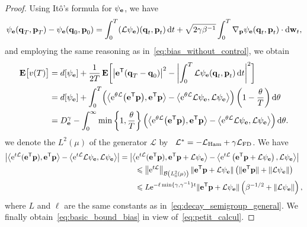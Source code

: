 \documentclass[11pt,a4paper]{article}
\begin{document}
\begin{proof}
    Using Itô's formula for $\psi_{\boldsymbol{\mathbf e}}$,
    we have
    \[
        \psi_{\boldsymbol{\mathbf e}}(\boldsymbol{\mathbf q}_T, \boldsymbol{\mathbf p}_T) - \psi_{\boldsymbol{\mathbf e}}(\boldsymbol{\mathbf q}_0, \boldsymbol{\mathbf p}_0)
        = \int_{0}^{T} (\mathcal L \psi_{\boldsymbol{\mathbf e}}) (\boldsymbol{\mathbf q}_t, \boldsymbol{\mathbf p}_t) \, \mathrm d t
        + \sqrt{2 \gamma \beta^{-1}} \int_{0}^{T} \nabla_{\boldsymbol{\mathbf p}} \psi_{\boldsymbol{\mathbf e}} (\boldsymbol{\mathbf q}_t, \boldsymbol{\mathbf p}_t) \cdot \mathrm d \boldsymbol{\mathbf w}_t,
    \]
    and employing the same reasoning as in~\eqref{eq:bias_without_control}, we obtain
    \begin{align*}
        \expect \bigl[v(T)\bigr]
    &= d[\psi_{\vect e}] +  \frac{1}{2T} \, \expect \biggl[ \bigl\lvert \vect e^\t (\vect q_T - \vect q_0) \bigr\rvert^2 - \biggl| \int_0^T {\mathcal L \psi_{\vect e}}(\vect q_t, \vect p_t) \, \d t \biggr|^2 \biggr] \\
    &= d[\psi_{\vect e}] +  \int_{0}^{T} \Bigl( \ip{\e^{\theta \mathcal L}\bigl(\vect e^\t \vect p\bigr)}{\vect e^\t \vect p} - \ip{\e^{\theta \mathcal L} \mathcal L \psi_{\vect e}}{\mathcal L \psi_{\vect e}} \Bigr) \left( 1 - \frac{\theta}{T} \right) \d \theta \\
    &= D^{\gamma}_{\vect e} - \int_{0}^{\infty} \min\left\{1, \frac{\theta}{T}\right\} \Bigl( \ip{\e^{\theta \mathcal L}\bigl(\vect e^\t \vect p\bigr)}{\vect e^\t  \vect p} - \ip{\e^{\theta \mathcal L} \mathcal L \psi_{\vect e}}{\mathcal L \psi_{\vect e}} \Bigr) \, \d \theta.
    \end{align*}
    we denote the $L^2(\mu)$ of the generator $\mathcal L$ by~
    \(
        \mathcal L^* = - \mathcal L_{\rm Ham} + \gamma \mathcal L_{\rm FD}
    \).
    We have
    \begin{align*}
         \left\lvert \ip{\e^{t \mathcal L}(\vect e^\t \vect p)}{\vect e^\t \vect p} - \ip{\e^{t \mathcal L} \mathcal L \psi_{\vect e}}{\mathcal L \psi_{\vect e}} \right\rvert
        &= \abs{\ip{\e^{t \mathcal L} (\vect e^\t \vect p)}{\vect e^\t \vect p + \mathcal L \psi_{\vect e}}- \ip{\e^{t \mathcal L} \left(\vect e^\t \vect p + \mathcal L \psi_{\vect e}\right)}{\mathcal  L\psi_{\vect e}}} \\
    &\qquad \leq \norm{\e^{t \mathcal L}}[\mathcal B\left(L^2_0(\mu) \right)] \norm*{\vect e^\t \vect p + \mathcal L \psi_{\vect e}}
     \left(\norm*{\vect e^\t \vect p} + \norm{\mathcal L \psi_{\vect e}} \right) \\
    &\qquad \leq L \e^{- \ell \min\{\gamma, \gamma^{-1}\} t} \norm*{\vect e^\t \vect p + \mathcal L\psi_{\vect e}}  \left(\beta^{-1/2} + \norm{\mathcal L \psi_{\vect e}} \right),
    \end{align*}
    where $L$ and $\ell$ are the same constants as in~\eqref{eq:decay_semigroup_general}.
    We finally obtain~\eqref{eq:basic_bound_bias} in view of~\eqref{eq:petit_calcul}.
\end{proof}
\end{document}
